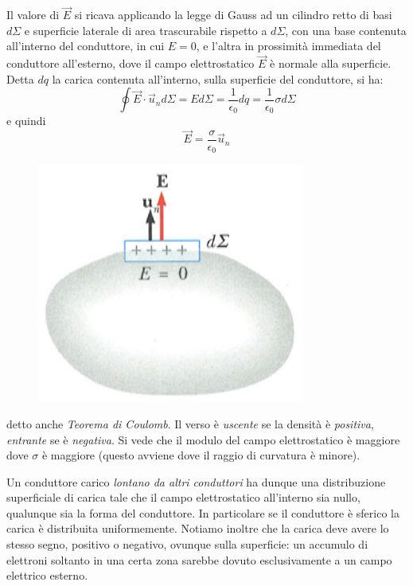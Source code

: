 \documentclass[class=book, crop=false, oneside, 12pt]{standalone}
\begin{document}
Il valore di \(\overrightarrow{E}\) si ricava applicando la legge di Gauss ad un cilindro retto di basi \(d \Sigma\) e superficie laterale di area trascurabile rispetto a \(d \Sigma\), con una base contenuta all'interno del conduttore, in cui \(E = 0\), e l'altra in prossimità immediata del conduttore all'esterno, dove il campo elettrostatico \(\overrightarrow{E}\) è normale alla superficie. 
Detta \(dq\) la carica contenuta all'interno, sulla superficie del conduttore, si ha:
\begin{equation*}
    \oint \overrightarrow{E} \cdot \overrightarrow{u}_n d \Sigma = E d \Sigma = \frac{1}{\epsilon_0} d q = \frac{1}{\epsilon_0} \sigma d \Sigma
\end{equation*}
e quindi
\begin{equation} \label{teorema_coulomb}
    \overrightarrow{E} = \frac{\sigma}{\epsilon_0}\overrightarrow{u}_n
\end{equation}
\begin{figure}[h]
    \includegraphics[scale=0.4]{conduttore_campo.png}
    \centering
    \caption{}
\end{figure}
detto anche \emph{Teorema di Coulomb}. 
Il verso è \emph{uscente} se la densità è \emph{positiva}, \emph{entrante} se è \emph{negativa}. 
Si vede che il modulo del campo elettrostatico è maggiore dove \(\sigma\) è maggiore (questo avviene dove il raggio di curvatura è minore).

Un conduttore carico \emph{lontano da altri conduttori} ha dunque una distribuzione superficiale di carica tale che il campo elettrostatico all'interno sia nullo, qualunque sia la forma del conduttore. 
In particolare se il conduttore è sferico la carica è distribuita uniformemente.
Notiamo inoltre che la carica deve avere lo stesso segno, positivo o negativo, ovunque sulla superficie: un accumulo di elettroni soltanto in una certa zona sarebbe dovuto esclusivamente a un campo elettrico esterno.
\end{document}
